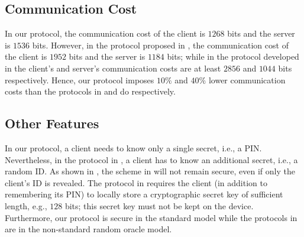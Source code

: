 \vspace{-4mm}
\subsection{Communication Cost}
\vspace{-2mm}

In our protocol, the communication cost of the client is $1268$ bits and the server is $1536$ bits. However, in the protocol proposed in \cite{WangW18},  the communication cost of the client is $1952$ bits and the server is  $1184$ bits; while in the protocol developed in \cite{JareckiJKSS21} the client's and server's communication costs are at least $2856$ and $1044$ bits respectively. Hence, our protocol imposes $10\%$ and $40\%$ lower communication costs than the protocols in \cite{WangW18} and \cite{JareckiJKSS21} do respectively.


\vspace{-4mm}
\subsection{Other Features}
\vspace{-1mm}
 In our protocol, a client needs to know only a single secret, i.e., a  PIN. Nevertheless, in the protocol in \cite{WangW18}, a client has to know an additional secret, i.e., a random ID. As shown in \cite{Scott12a}, the scheme in \cite{WangW18} will not remain secure, even if only the client's ID is revealed. The protocol in \cite{JareckiJKSS21} requires the client (in addition to remembering its PIN) to locally store a cryptographic secret key of sufficient length, e.g., $128$ bits; this secret key must not be kept on the device. 
 Furthermore, our protocol is secure in the standard model while the protocols in \cite{WangW18,JareckiJKSS21} are in the non-standard random oracle model. 

